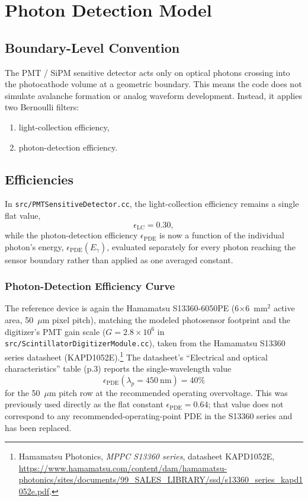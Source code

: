\section{Photon Detection Model}
\subsection{Boundary-Level Convention}
The PMT / SiPM sensitive detector acts only on optical photons crossing into the photocathode volume at a geometric boundary. This means the code does not simulate avalanche formation or analog waveform development. Instead, it applies two Bernoulli filters:
\begin{enumerate}[label=\arabic*.]
\item light-collection efficiency,
\item photon-detection efficiency.
\end{enumerate}

\subsection{Efficiencies}
In \texttt{src/PMTSensitiveDetector.cc}, the light-collection efficiency
remains a single flat value,
\[
\epsilon_\mathrm{LC} = 0.30,
\]
while the photon-detection efficiency $\epsilon_\mathrm{PDE}$ is now a
function of the individual photon's energy, $\epsilon_\mathrm{PDE}(E_\gamma)$,
evaluated separately for every photon reaching the sensor boundary rather
than applied as one averaged constant.

\subsubsection{Photon-Detection Efficiency Curve}
\label{sec:pde-curve}
The reference device is again the Hamamatsu S13360-6050PE (6$\times$6~mm$^2$
active area, 50~$\mu$m pixel pitch), matching the modeled photosensor
footprint and the digitizer's PMT gain scale ($G=2.8\times10^6$ in
\texttt{src/ScintillatorDigitizerModule.cc}), taken from the Hamamatsu
S13360 series datasheet (KAPD1052E).\footnote{Hamamatsu Photonics,
\emph{MPPC S13360 series}, datasheet KAPD1052E,
\url{https://www.hamamatsu.com/content/dam/hamamatsu-photonics/sites/documents/99_SALES_LIBRARY/ssd/s13360_series_kapd1052e.pdf}.}
The datasheet's ``Electrical and optical characteristics'' table (p.3)
reports the single-wavelength value
\[
  \epsilon_\mathrm{PDE}(\lambda_p = 450~\mathrm{nm}) = 40\%
\]
for the 50~$\mu$m pitch row at the recommended operating overvoltage. This
was previously used directly as the flat constant
$\epsilon_\mathrm{PDE}=0.64$; that value does not correspond to any
recommended-operating-point PDE in the S13360 series and has been replaced.

